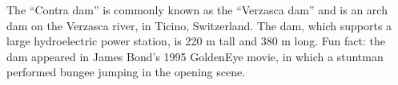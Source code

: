 The ``Contra dam'' is commonly known as the ``Verzasca dam'' and is an arch dam on the Verzasca river, in Ticino, Switzerland.
The dam, which supports a large hydroelectric power station, is 220 m tall and 380 m long.
Fun fact: the dam appeared in James Bond's 1995 GoldenEye movie, in which a stuntman performed bungee jumping in the opening scene.